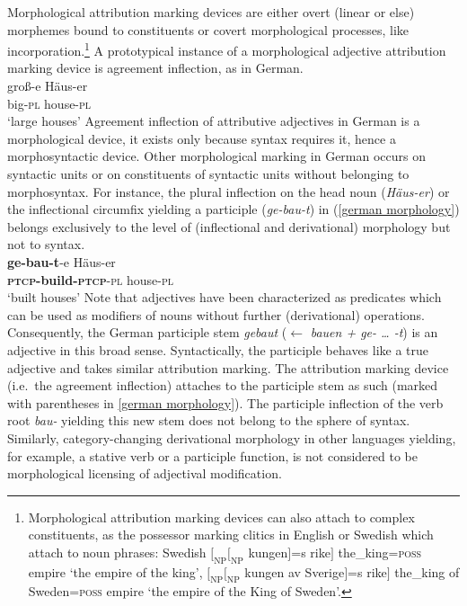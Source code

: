 Morphological attribution marking devices are either overt (linear or else) morphemes bound to constituents or covert morphological processes, like incorporation.\footnote{Morphological attribution marking devices can also attach to complex constituents, as the possessor marking clitics in English or Swedish which attach to noun phrases: Swedish $[_\textrm{NP} [_\textrm{NP}$ kungen$]$=s rike$]$ the\_king=\textsc{poss} empire ‘the empire of the king’, $[_\textrm{NP} [_\textrm{NP}$ kungen av Sverige$]$=s rike$]$ the\_king of Sweden=\textsc{poss} empire ‘the empire of the King of Sweden’.} A prototypical instance of a morphological adjective attribution marking device is agreement inflection, as in German.
\ea
{}\\
\gll	groß-e Häus-er\\
	big-\textsc{pl} house-\textsc{pl}\\
\glt	‘large houses’
\z
Agreement inflection of attributive adjectives in German is a morphological device, it exists only because syntax requires it,  hence a morphosyntactic device. Other morphological marking in German occurs on syntactic units or on constituents of syntactic units without belonging to morphosyntax. For instance, the plural inflection on the head noun (\textit{Häus-er}) or the inflectional circumfix yielding a participle (\textit{ge-bau-t}) in (\ref{german morphology}) belongs exclusively to the level of (inflectional and derivational) morphology but not to syntax.
\ea\label{german morphology}
\\
\gll	\textbf{ge-bau-t}-e Häus-er\\
	\textbf{\textsc{ptcp}-build-\textsc{ptcp}}-\textsc{pl} house-\textsc{pl}\\
\glt	‘built houses’
\z
Note that adjectives have been characterized as predicates which can be used as modifiers of nouns without further (derivational) operations. Consequently, the German participle stem \textit{gebaut} ($\leftarrow$ \textit{bauen + ge- … -t}) is an adjective in this broad sense. Syntactically, the participle behaves like a true adjective and takes similar attribution marking. The attribution marking device (i.e.~the agreement inflection) attaches to the participle stem as such (marked with parentheses in \ref{german morphology}). The participle inflection of the verb root \textit{bau-} yielding this new stem does not belong to the sphere of syntax. Similarly, category-changing derivational morphology in other languages yielding, for example, a stative verb or a participle function, is not considered to be morphological licensing of adjectival modification.

